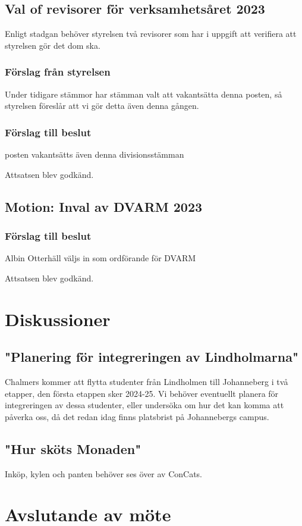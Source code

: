 \documentclass[protokoll]{dvd}
\begin{document}
\subsection*{Val of revisorer för verksamhetsåret 2023}
Enligt stadgan behöver styrelsen två revisorer som har i uppgift
att verifiera att styrelsen gör det dom ska.

\subsubsection*{Förslag från styrelsen}
Under tidigare stämmor har stämman valt att vakantsätta denna posten,
så styrelsen föreslår att vi gör detta även denna gången.

\subsubsection*{Förslag till beslut}
\begin{attsatser}
    \item posten vakantsätts även denna divisionsstämman
\end{attsatser}

Attsatsen blev godkänd.

\subsection*{Motion: Inval av DVARM 2023}

\subsubsection*{Förslag till beslut}
\begin{attsatser}
	\item Albin Otterhäll väljs in som ordförande för DVARM
\end{attsatser}

Attsatsen blev godkänd.

\section{Diskussioner}\label{sec:discussioner}

\subsection{"Planering för integreringen av Lindholmarna"}
Chalmers kommer att flytta studenter från Lindholmen till Johanneberg i två etapper, den första etappen sker 2024-25.
Vi behöver eventuellt planera för integreringen av dessa studenter, eller undersöka om hur det kan komma att påverka oss, 
då det redan idag finns platsbrist på Johannebergs campus.


\subsection{"Hur sköts Monaden" }
Inköp, kylen och panten behöver ses över av ConCats.

\section{Avslutande av möte}


\end{document}
